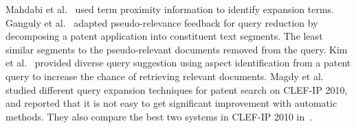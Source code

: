 Mahdabi et al.~\cite{Mahdabi2013} used term proximity
information to identify expansion terms. Ganguly et
al.~\cite{ganguly2011patent} adapted pseudo-relevance feedback for
query reduction by decomposing a patent application into constituent
text segments.
The least similar
segments to the pseudo-relevant documents removed from the query.
Kim et al.~\cite{kim2014diversifying} provided diverse query suggestion using
aspect identification from a patent query to increase the chance of
retrieving relevant documents. Magdy et al.~\cite{magdy2011study} 
studied different query expansion techniques for patent search on CLEF-IP 2010, 
and reported that it is not easy to get significant improvement with automatic methods. 
They also compare the best two systems in CLEF-IP 2010
in~\cite{magdy2011simple}.
\begin{comment}
discussed that standard query expansion techniques are
less effective in patent retrieval, where the initial query is the full texts of query
patents. 
\end{comment}












